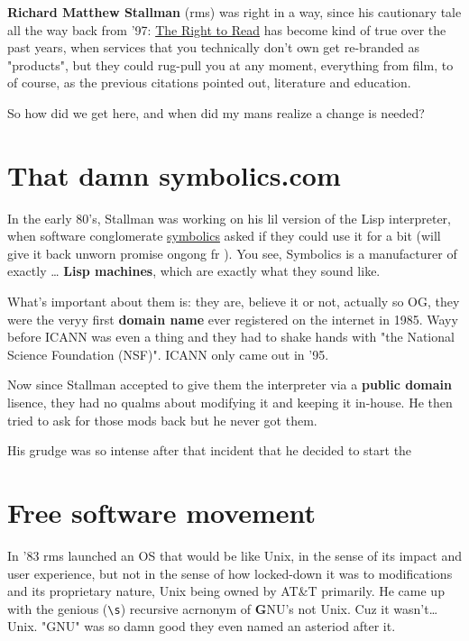 \documentclass[sigplan,screen]{acmart}
\begin{document}
\textbf{Richard Matthew Stallman} (rms) was right in a way, since his cautionary tale all the way back from '97: \href{https://www.gnu.org/philosophy/right-to-read.html}{The Right to Read}\cite{Stallman1997TheRT} has become kind of true over the past years, when services that you technically don't own get re-branded as "products"\cite{product}, but they could rug-pull you at any moment, everything from film\cite{jellyfin}, to of course, as the previous citations pointed out, literature and education.

So how did we get here, and when did my mans realize a change is needed?

\section{That damn symbolics.com}
In the early 80's, Stallman was working on his lil version of the Lisp interpreter, when software conglomerate \href{https://symbolics.com}{symbolics} asked if they could use it for a bit (will give it back unworn promise ongong fr ). You see, Symbolics is a manufacturer of exactly \ldots \textbf{ Lisp machines}, which are exactly what they sound like.

What's important about them is: they are, believe it or not, actually so OG, they were the veryy first \textbf{domain name} ever registered on the internet in 1985. Wayy before ICANN was even a thing and they had to shake hands with "the National Science Foundation (NSF)". ICANN only came out in '95. \cite{national-science-foundation}

Now since Stallman accepted to give them the interpreter via a \textbf{public domain} lisence, they had no qualms about modifying it and keeping it in-house. He then tried to ask for those mods back but he never got them.

His grudge was so intense after that incident that he decided to start the

\section{Free software movement}
In '83 rms launched an OS that would be like Unix, in the sense of its impact and user experience, but not in the sense of how locked-down it was to modifications and its proprietary nature, Unix being owned by AT\&T primarily. He came up with the genious (\verb|\s|) recursive acrnonym of \textbf{G}NU's not Unix. Cuz it wasn't\ldots Unix. "GNU" was so damn good they even named an asteriod after it. \cite{gnu-asteriod}
\end{document}
